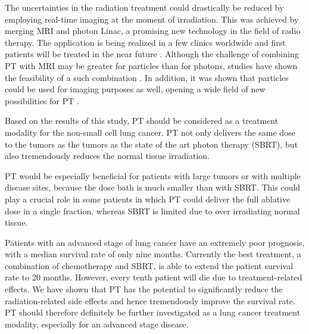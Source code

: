 The uncertainties in the radiation treatment could drastically be reduced by employing real-time imaging at the moment of irradiation.
This was achieved by merging MRI and photon Linac, a promising new technology in the field of radio therapy. The application is being realized in a few clinics
worldwide and first patients will be treated in the near future \cite{Lagendijk2016}.
Although the challenge of combining PT with MRI may be greater for particles than for photons, studies have shown the feasibility of a such combination \cite{Hartman2015}.
In addition, it was shown that particles could be used for imaging purposes as well, opening a wide
field of new possibilities for PT \cite{Prall2016}.

Based on the results of this study, PT should be considered as a treatment modality for the non-small cell lung cancer. PT not only delivers the same dose to the
tumors as the tumors as the state of the art photon therapy (SBRT), but also tremendously reduces the normal tissue irradiation.

\newpage

PT would be especially beneficial for patients with large tumors or with multiple disease sites, because the dose bath is much
smaller than with SBRT. This could play a crucial role in some patients in which PT could deliver the full ablative dose in a single fraction, whereas SBRT is limited due to over 
irradiating normal tissue.


Patients with an advanced stage of lung cancer have an extremely poor prognosis, with a median survival rate of only nine months. 
Currently the best treatment, a combination of chemotherapy and SBRT, is able to extend the patient survival rate to 20 months. 
However, every tenth patient will die due to treatment-related effects. We have shown that PT has the potential to 
significantly reduce the radiation-related side effects and hence tremendously improve the survival rate.
PT should therefore definitely be further investigated as a lung cancer treatment modality, especially for an advanced stage disease.

